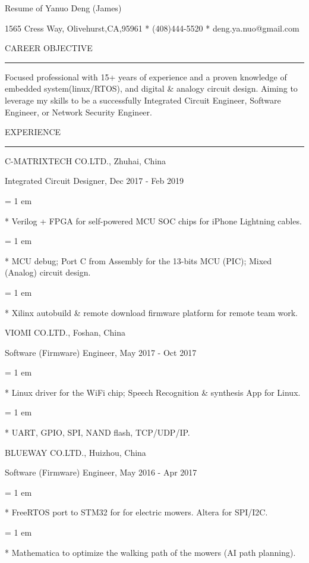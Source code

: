 

\centerline{ \FFbg
Resume of Yanuo Deng (James)
}

\centerline{ %
1565 Cress Way, Olivehurst,CA,95961
*
(408)444-5520
*
deng.ya.nuo@gmail.com
}

{ \medbreak } { \FFbg
CAREER OBJECTIVE
}

{ \smallbreak } {\par\noindent\hrule} { \smallbreak }

    Focused professional with 15+ years of experience
and a proven knowledge of embedded system(linux/RTOS),
and digital \& analogy circuit design.
    Aiming to leverage my skills to be a successfully
Integrated Circuit Engineer,
Software Engineer,
or Network Security Engineer.

{ \medbreak } { \FFbg
EXPERIENCE
}
{ \smallbreak } {\par\noindent\hrule} { \smallbreak }

{ \medbreak } { \FFbg
C-MATRIXTECH CO.LTD., Zhuhai, China
}

{ \FFte
Integrated Circuit Designer, Dec 2017 - Feb 2019
}

{ \parindent = 1 em \item{*}
 Verilog + FPGA for self-powered MCU SOC chips for iPhone Lightning cables.
}

{ \parindent = 1 em \item{*}
 MCU debug; Port C from Assembly for the 13-bits MCU (PIC); Mixed (Analog) circuit design.
}
{ \parindent = 1 em \item{*}
 Xilinx autobuild \& remote download firmware platform for remote team work.
}

{ \medbreak } { \FFbg
VIOMI CO.LTD., Foshan, China
}

{ \FFte
Software (Firmware) Engineer, May 2017 - Oct 2017
}

{ \parindent = 1 em \item{*}
 Linux driver for the WiFi chip; Speech Recognition \& synthesis App for Linux.
 }
{ \parindent = 1 em \item{*}
 UART, GPIO, SPI, NAND flash, TCP/UDP/IP.
 }

{ \medbreak } { \FFbg
BLUEWAY CO.LTD., Huizhou, China
}

{ \FFte
Software (Firmware) Engineer, May 2016 - Apr 2017
}
{ \parindent = 1 em \item{*}
 FreeRTOS port to STM32 for for electric mowers. Altera for SPI/I2C.
}
{ \parindent = 1 em \item{*}
Mathematica to optimize the walking path of the mowers (AI path planning).
}


